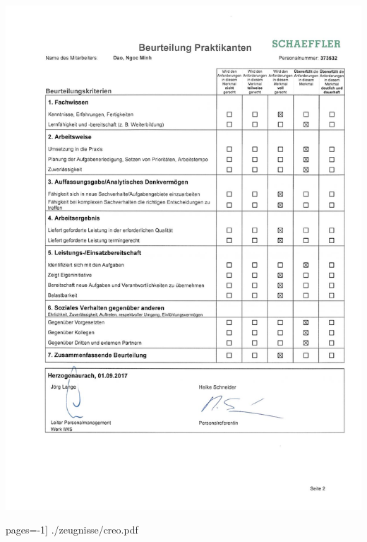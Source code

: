 \documentclass[12pt,a4paper]{scrartcl}
\begin{document}
\includegraphics[width=\linewidth, keepaspectratio]{./zeugnisse/praktikumzeugnis_2.jpg}

%



\newpage
{}

\newpage
{}

 pages=-1] {./zeugnisse/creo.pdf}
\end{document}
